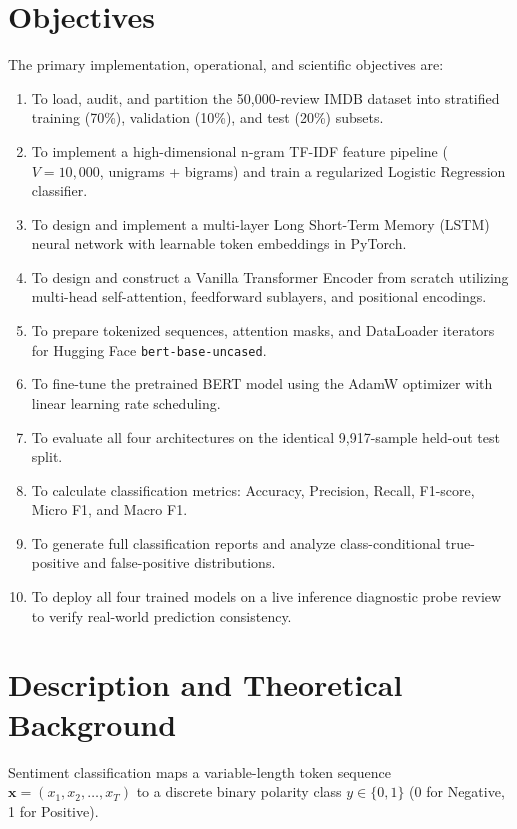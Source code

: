 \documentclass[12pt,a4paper]{report}
\begin{document}
\section{Objectives}
The primary implementation, operational, and scientific objectives are:
\begin{enumerate}[label=\textbf{\arabic*.}]
    \item To load, audit, and partition the 50,000-review IMDB dataset into stratified training (70\%), validation (10\%), and test (20\%) subsets.
    \item To implement a high-dimensional n-gram TF-IDF feature pipeline ($V = 10,000$, unigrams + bigrams) and train a regularized Logistic Regression classifier.
    \item To design and implement a multi-layer Long Short-Term Memory (LSTM) neural network with learnable token embeddings in PyTorch.
    \item To design and construct a Vanilla Transformer Encoder from scratch utilizing multi-head self-attention, feedforward sublayers, and positional encodings.
    \item To prepare tokenized sequences, attention masks, and DataLoader iterators for Hugging Face \texttt{bert-base-uncased}.
    \item To fine-tune the pretrained BERT model using the AdamW optimizer with linear learning rate scheduling.
    \item To evaluate all four architectures on the identical 9,917-sample held-out test split.
    \item To calculate classification metrics: Accuracy, Precision, Recall, F1-score, Micro F1, and Macro F1.
    \item To generate full classification reports and analyze class-conditional true-positive and false-positive distributions.
    \item To deploy all four trained models on a live inference diagnostic probe review to verify real-world prediction consistency.
\end{enumerate}

\section{Description and Theoretical Background}
Sentiment classification maps a variable-length token sequence $\mathbf{x} = (x_1, x_2, \dots, x_T)$ to a discrete binary polarity class $y \in \{0, 1\}$ (0 for Negative, 1 for Positive).
\end{document}
